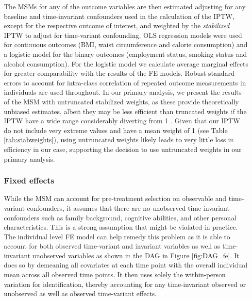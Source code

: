 The \acp{MSM} for any of the outcome variables are then estimated adjusting for any baseline and time-invariant confounders used in the calculation of the \ac{IPTW}, except for the respective outcome of interest, and weighted by the \textit{stabilized} \ac{IPTW} to adjust for time-variant confounding. \ac{OLS} regression models were used for continuous outcomes (\ac{BMI}, waist circumference and calorie consumption) and a logistic model for the binary outcomes (employment status, smoking status and alcohol consumption). For the logistic model we calculate average marginal effects for greater comparability with the results of the \ac{FE} models. Robust standard errors to account for intra-class correlation of repeated outcome measurements in individuals are used throughout. In our primary analysis, we present the results of the \ac{MSM} with untruncated stabilized weights, as these provide theoretically unbiased estimates, albeit they may be less efficient than truncated weights if the \ac{IPTW} have a wide range considerably diverting from 1 \parencite{Cole2008}. Given that our \ac{IPTW} do not include very extreme values and have a mean weight of 1 (see Table \ref{tab:stabweights}), using untruncated weights likely leads to very little loss in efficiency in our case, supporting the decision to use untruncated weights in our primary analysis.

\subsubsection{Fixed effects}

While the \ac{MSM} can account for pre-treatment selection on observable and time-variant confounders, it assumes that there are no unobserved time-invariant confounders such as family background, cognitive abilities, and other personal characteristics. This is a strong assumption that might be violated in practice. The individual level \ac{FE} model can help remedy this problem as it is able to account for both observed time-variant and invariant variables as well as time-invariant unobserved variables as shown in the \ac{DAG} in Figure \ref{fig:DAG_fe}. It does so by demeaning all covariates at each time point with the overall individual mean across all observed time points. It then uses solely the within-person variation for identification, thereby accounting for any time-invariant observed or unobserved as well as observed time-variant effects. 


